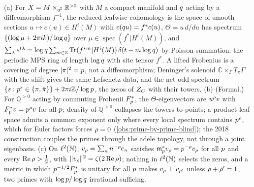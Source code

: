 \begin{proposition}[Suspension = ring; the zeros as joint eigenvalues; the Bost--Connes shadow]
\label{prop:deninger-suspension-ring}
(a) For $X = M\times_{q^{\mathbb Z}}\mathbb R^{>0}$ with $M$ a compact manifold and $q$ acting by a diffeomorphism
$f^{-1}$, the reduced leafwise cohomology is the space of smooth sections $u\mapsto c(u)\in H^i(M)$ with
$c(q u) = f^*c(u)$, $\Theta = u\,d/du$ has spectrum $\{(\log\mu+2\pi ik)/\log q\}$ over $\mu\in\operatorname{spec}(f^*|H^i(M))$, %
and $\sum_\lambda e^{t\lambda} = \log q\sum_{m\in\mathbb Z}\operatorname{Tr}(f^{*m}|H^i(M))\,\delta(t-m\log q)$ by Poisson summation:
the periodic MPS ring of length $\log q$ with site tensor $f^*$. A lifted Frobenius is a covering of degree
$|\pi|^2 = p$, not a diffeomorphism; Deninger's solenoid $\mathbb C\times_\Gamma T_\pi\Gamma$ with the shift gives
the same Lefschetz data, and the net odd spectrum $\{s : p^s\in\{\pi,\bar\pi\}\}+2\pi i\mathbb Z/\log p$, the zeros
of $Z_C$ with their towers. (b) (Formal.) For $\mathbb Q^{>0}$ acting by commuting Frobenii $F_p^*$, the
$\Theta$-eigenvectors are $u^\rho v$ with $F_p^*v = p^\rho v$ for all $p$; density of $\mathbb Q^{>0}$ collapses
the towers to points; a product leaf space admits a common exponent only where every local spectrum contains
$p^\rho$, which for Euler factors forces $\rho = 0$ (\cref{obs:prime-by-prime-blind}); the 2018 construction
couples the primes through the adele topology, not through a joint eigenbasis. (c) On $\ell^2(\mathbb N)$,
$v_\rho = \sum_nn^{-\rho}e_n$ satisfies $\mathsf m_{p}^*v_\rho = p^{-\rho}v_\rho$ for all $p$ and every
$\operatorname{Re}\rho>\tfrac12$, with $\|v_\rho\|^2 = \zeta(2\operatorname{Re}\rho)$; nothing in $\ell^2(\mathbb N)$ selects the zeros, and a
metric in which $p^{-1/2}F_p^*$ is unitary for all $p$ makes $v_\rho\perp v_{\rho'}$ unless
$\rho+\bar{\rho}' = 1$, two primes with $\log p/\log q$ irrational sufficing.
\end{proposition}

